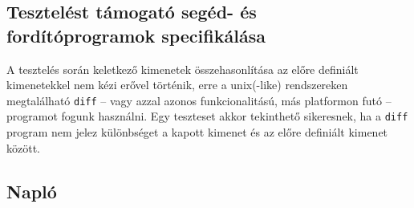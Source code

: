 %		
	    	
	\subsection{Tesztelést támogató segéd- és fordítóprogramok specifikálása}		
A tesztelés során keletkező kimenetek összehasonlítása az előre definiált kimenetekkel nem kézi erővel történik, erre a unix(-like) rendszereken megtalálható \texttt{diff} -- vagy azzal azonos funkcionalitású, más platformon futó -- programot fogunk használni. Egy teszteset akkor tekinthető sikeresnek, ha a \texttt{diff} program nem jelez különbséget a kapott kimenet és az előre definiált kimenet között.

	\subsection{Napló}

